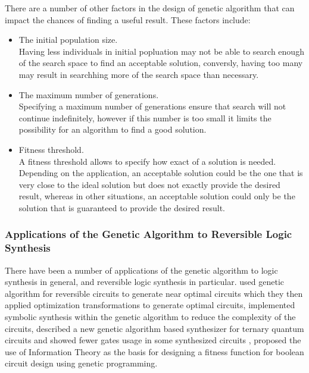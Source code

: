 There are a number of other factors in the design of genetic algorithm that can impact the chances of finding a useful result. 
These factors include:
\begin{itemize}
 \item The initial population size.
\\ Having less individuals in initial popluation may not be able to search enough of the search space to 
find an acceptable solution, conversly, having too many may result in searchhing more of the search space than necessary.
 \item The maximum number of generations.
\\ Specifying a maximum number of generations ensure that search will not continue indefinitely, however if this number is too 
small it limits the possibility for an algorithm to find a good solution.
 \item Fitness threshold.
\\A fitness threshold allows to specify how exact of a solution is needed. Depending on the application, an acceptable solution could be the one that is very close to the ideal solution but does not exactly provide the
desired result, whereas in other situations, an acceptable solution could only be the solution that is guaranteed to provide the desired result. 
\end{itemize}
 

\subsubsection{Applications of the Genetic Algorithm to Reversible Logic Synthesis}

There have been a number of applications of the genetic algorithm to logic synthesis in general, and reversible logic synthesis in 
particular. \cite{Lukac2003} used genetic algorithm for reversible circuits to generate near optimal circuits which they then applied 
optimization transformations to generate optimal circuits, 
\cite{Lukac2008} implemented symbolic synthesis within the genetic algorithm to reduce the complexity of the circuits, 
\cite{Khan2004} described a new genetic algorithm based synthesizer for ternary quantum circuits and showed fewer gates usage in some synthesized circuits , 
\cite{Aguirre2003} proposed the use of Information Theory as the basis for designing a fitness function for boolean circuit design using 
genetic programming.